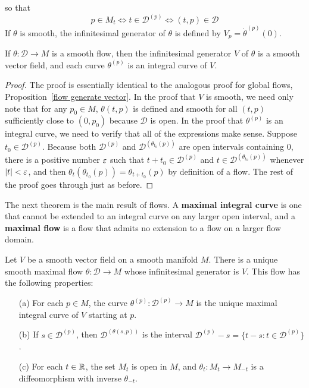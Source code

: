 so that
\[p\in M_t\iff t\in\mathcal{D}^{(p)}\iff(t,p)\in\mathcal{D}\]
If $\theta$ is smooth, the infinitesimal generator of $\theta$ is defined by $V_p=\dot{\theta}^{(p)}(0)$.
\begin{proposition}
If $\theta:\mathcal{D}\to M$ is a smooth flow, then the infinitesimal generator $V$ of $\theta$ is a smooth vector field, and each curve $\theta^{(p)}$ is an integral curve of $V$.
\end{proposition}
\begin{proof}
The proof is essentially identical to the analogous proof for global flows, Proposition~\ref{flow generate vector}. In the proof that $V$ is smooth, we need only note that for any $p_0\in M$, $\theta(t,p)$ is defined and smooth for all $(t,p)$ sufficiently close to $(0,p_0)$ because $\mathcal{D}$ is open. In the proof that $\theta^{(p)}$ is an integral curve, we need to verify that all of the expressions make sense. Suppose $t_0\in\mathcal{D}^{(p)}$. Because both $\mathcal{D}^{(p)}$ and $\mathcal{D}^{(\theta_{t_0}(p))}$ are open intervals containing $0$, there is a positive number $\varepsilon$ such that $t+t_0\in\mathcal{D}^{(p)}$ and $t\in\mathcal{D}^{(\theta_{t_0}(p))}$ whenever $|t|<\varepsilon$, and then $\theta_t(\theta_{t_0}(p))=\theta_{t+t_0}(p)$ by definition of a flow. The rest of the proof goes through just as before.
\end{proof}
The next theorem is the main result of flows. A \textbf{maximal integral curve} is one that cannot be extended to an integral curve on any larger open interval, and a \textbf{maximal flow} is a flow that admits no extension to a flow on a larger flow domain.
\begin{theorem}\label{flow fundamental thm}
Let $V$ be a smooth vector field on a smooth manifold $M$. There is a unique smooth maximal flow $\theta:\mathcal{D}\to M$ whose infinitesimal generator is $V$. This flow has the following properties:
\begin{itemize}
\item[(a)] For each $p\in M$, the curve $\theta^{(p)}:\mathcal{D}^{(p)}\to M$ is the unique maximal integral curve of $V$ starting at $p$.
\item[(b)] If $s\in\mathcal{D}^{(p)}$, then $\mathcal{D}^{(\theta(s,p))}$ is the interval $\mathcal{D}^{(p)}-s=\{t-s:t\in\mathcal{D}^{(p)}\}$.
\item[(c)] For each $t\in\mathbb{R}$, the set $M_t$ is open in $M$, and $\theta_t:M_t\to M_{-t}$ is a diffeomorphism with inverse $\theta_{-t}$.
\end{itemize}
\end{theorem}

